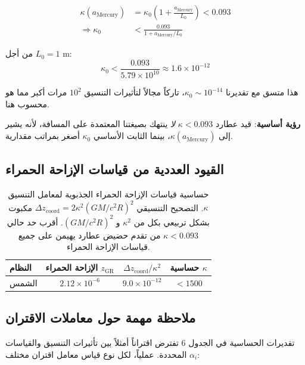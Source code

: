 \documentclass[11pt,a4paper]{article}
\begin{document}
	\begin{align}
		\kappa(a_{\text{Mercury}}) &= \kappa_0 \left(1 + \frac{a_{\text{Mercury}}}{L_0}\right) < 0.093 \\
		\Rightarrow \kappa_0 &< \frac{0.093}{1 + a_{\text{Mercury}}/L_0}
	\end{align}
	
	من أجل $L_0 = 1$ m:
	\begin{equation}
		\kappa_0 < \frac{0.093}{5.79 \times 10^{10}} \approx 1.6 \times 10^{-12}
	\end{equation}
	
	هذا متسق مع تقديرنا $\kappa_0 \sim 10^{-14}$، تاركاً مجالاً لتأثيرات التنسيق $10^2$ مرات أكبر مما هو محسوب هنا.
	
	\textbf{رؤية أساسية}: قيد عطارد $\kappa < 0.093$ \textit{لا} ينتهك بصيغتنا المعتمدة على المسافة، لأنه يشير إلى $\kappa(a_{\text{Mercury}})$، بينما الثابت الأساسي $\kappa_0$ أصغر بمراتب مقدارية.
	
	\subsection{القيود العددية من قياسات الإزاحة الحمراء}
	
	\begin{table}[htbp]
		\centering
		\begin{english}
			\begin{tabular}{lccc}
				\toprule
				\textbf{النظام} & \textbf{الإزاحة الحمراء $z_{\text{GR}}$} & \textbf{$\Delta z_{\text{coord}}/\kappa^2$} & \textbf{حساسية $\kappa$} \\
				\midrule
				الشمس & $2.12\times10^{-6}$ & $9.0\times10^{-12}$ & $<1500$ \\
				\bottomrule
			\end{tabular}
		\end{english}
		\caption{حساسية قياسات الإزاحة الحمراء الجذبوية لمعامل التنسيق $\kappa$. التصحيح التنسيقي $\Delta z_{\text{coord}} = 2\kappa^2 (GM/c^2R)^2$ مكبوت بشكل تربيعي بكل من $\kappa^2$ و $(GM/c^2R)^2$. أقرب حد حالي $\kappa < 0.093$ من تقدم حضيض عطارد يهيمن على جميع قياسات الإزاحة الحمراء.}
	\end{table}
	
	\subsection{ملاحظة مهمة حول معاملات الاقتران}
	
	تقديرات الحساسية في الجدول 6 تفترض اقتراناً أمثلاً بين تأثيرات التنسيق والقياسات المحددة. عملياً، لكل نوع قياس معامل اقتران مختلف $\alpha_i$:
	
\end{document}
